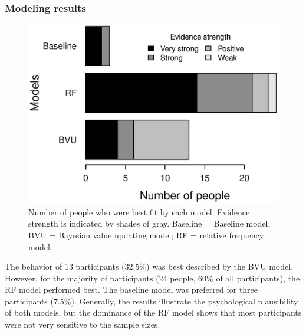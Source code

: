 \documentclass[a4paper,man, natbib]{apa6} %
\begin{document}
\subsubsection{Modeling results}

\begin{figure}[htbp] 
  \centering
\includegraphics[width=.8\linewidth, keepaspectratio]{modelcomp2.eps}
  \caption{Number of people who were best fit by each model. Evidence strength is indicated by shades of gray. Baseline = Baseline model; BVU = Bayesian value updating model; RF = relative frequency model.}
  \label{fig:modeling2}
\end{figure}

The behavior of 13 participants (32.5\%) was best described by the BVU model. %
However, for the majority of participants (24 people, 60\% of all participants), the RF  model performed best. The baseline model was preferred for three participants (7.5\%). Generally, the results illustrate the psychological plausibility of both models, but the dominance of the RF model shows that most participants were not very sensitive to the sample sizes.  
\end{document}
